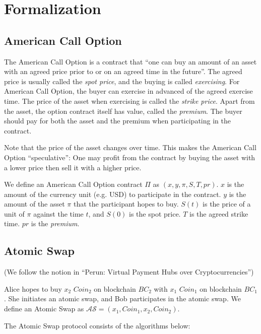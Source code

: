 \section{Formalization}
\label{sec:formalization}

\subsection{American Call Option}

The American Call Option is a contract that ``one can buy an amount of an asset with an agreed price prior to or on an agreed time in the future''.
The agreed price is usually called the \textit{spot price}, and the buying is called \textit{exercising}.
For American Call Option, the buyer can exercise in advanced of the agreed exercise time.
The price of the asset when exercising is called the \textit{strike price}.
Apart from the asset, the option contract itself has value, called the \textit{premium}.
The buyer should pay for both the asset and the premium when participating in the contract.

Note that the price of the asset changes over time. This makes the American Call Option ``speculative'': One may profit from the contract by buying the asset with a lower price then sell it with a higher price.

We define an American Call Option contract $\Pi$ as $(x, y, \pi, S, T, pr)$.
$x$ is the amount of the currency unit (e.g. USD) to participate in the contract.
$y$ is the amount of the asset $\pi$ that the participant hopes to buy.
$S(t)$ is the price of a unit of $\pi$ against the time $t$, and $S(0)$ is the spot price.
$T$ is the agreed strike time.
$pr$ is the \textit{premium}.

\subsection{Atomic Swap}

(We follow the notion in ``Perun: Virtual Payment Hubs over Cryptocurrencies'')

Alice hopes to buy $x_2$ $Coin_2$ on blockchain $BC_2$ with $x_1$ $Coin_1$ on blockchain $BC_1$.
She initiates an atomic swap, and Bob participates in the atomic swap.
We define an Atomic Swap as $\mathcal{AS} = (x_1, Coin_1, x_2, Coin_2)$.

The Atomic Swap protocol consists of the algorithms below:

